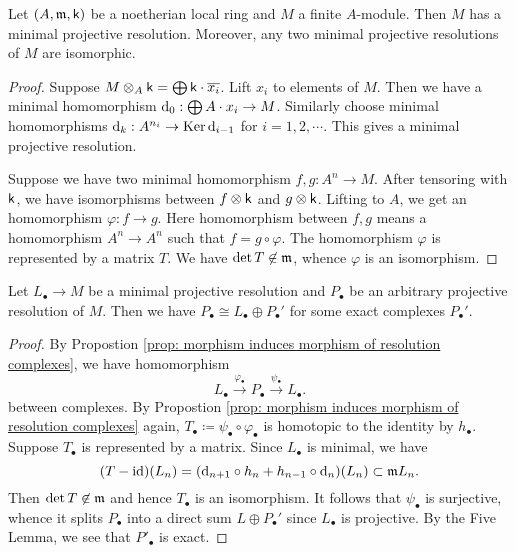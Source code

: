    \begin{proposition}\label{prop: minimal projective resolution exists and unique}
        Let \((A,{\mathfrak{m}},{\mathsf{k}})\) be a noetherian local ring and \(M\) a finite \(A\)-module.
        Then \(M\) has a minimal projective resolution.
        Moreover, any two minimal projective resolutions of \(M\) are isomorphic.
    \end{proposition}
    \begin{proof}
        Suppose \(M\otimes_A {\mathsf{k}} = \bigoplus {\mathsf{k}} \cdot \overline{x_i} \).
        Lift \(x_i\) to elements of \(M\).
        Then we have a minimal homomorphism \({\mathrm{d}}_0: \bigoplus A \cdot x_i \to M\).
        Similarly choose minimal homomorphisms \( {\mathrm{d}}_k: A^{n_i} \to \operatorname{Ker} {\mathrm{d}}_{i-1} \) for \(i = 1,2,\cdots\).
        This gives a minimal projective resolution.

        Suppose we have two minimal homomorphism \(f,g: A^n \to M\).
        After tensoring with \({\mathsf{k}}\), we have isomorphisms between \(f\otimes {\mathsf{k}}\) and \(g\otimes {\mathsf{k}}\).
        Lifting to $A$, we get an homomorphism \(\varphi: f \to g\).
        Here homomorphism between \(f,g\) means a homomorphism \(A^n \to A^n\) such that \(f = g \circ \varphi\).
        The homomorphism \(\varphi\) is represented by a matrix \(T\).
        We have \(\det T \not\in {\mathfrak{m}}\), whence \(\varphi\) is an isomorphism.
    \end{proof}

    \begin{proposition}\label{prop: projective resolution is a direct sum of minimal projective resolution}
        Let \(L_\bullet \to M\) be a minimal projective resolution and \(P_\bullet\) be an arbitrary projective resolution of \(M\).
        Then we have \(P_\bullet \cong L_\bullet \oplus P_\bullet'\) for some exact complexes \(P_\bullet'\).
    \end{proposition}
    \begin{proof}
        By Propostion \ref{prop: morphism induces morphism of resolution complexes}, we have homomorphism 
        \[ L_\bullet \xrightarrow{\varphi_\bullet} P_\bullet \xrightarrow{\psi_\bullet} L_\bullet. \]
        between complexes.
        By Propostion \ref{prop: morphism induces morphism of resolution complexes} again, \(T_\bullet \coloneqq \psi_\bullet \circ \varphi_\bullet\) is homotopic to the identity by \(h_\bullet\).
        Suppose \(T_\bullet\) is represented by a matrix.
        Since \(L_\bullet\) is minimal, we have 
        \[ (T - {\operatorname{id}})(L_n) = ({\mathrm{d}}_{{n+1}} \circ h_n + h_{n-1} \circ {\mathrm{d}}_{n})(L_n) \subset {\mathfrak{m}} L_n. \]
        Then \(\det T \not\in {\mathfrak{m}}\) and hence \(T_\bullet\) is an isomorphism.
        It follows that \(\psi_\bullet\) is surjective, whence it splits \(P_\bullet\) into a direct sum \( L \oplus P_\bullet'\) since \(L_\bullet\) is projective. 
        By the Five Lemma, we see that \(P'_\bullet\) is exact.
    \end{proof}

